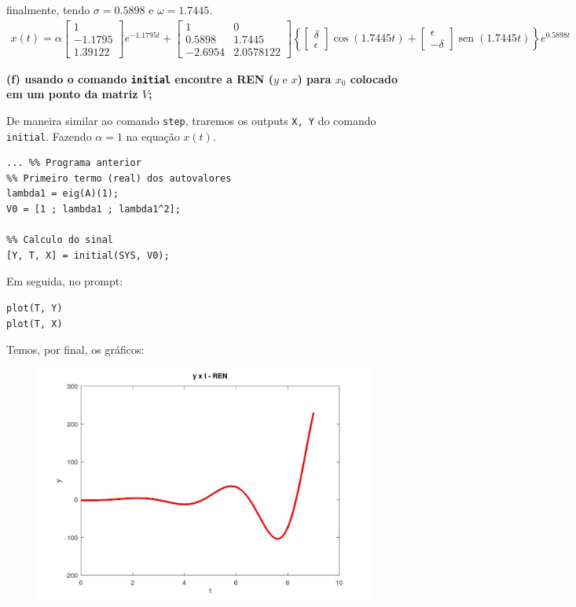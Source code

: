 \documentclass[11pt]{article}
\DeclareMathOperator{\sen}{sen}
\begin{document}
finalmente, tendo $\sigma = 0.5898$ e $\omega = 1.7445$.
\begin{align*}
  x(t) = \alpha
  \begin{bmatrix}
    1\\
    -1.1795\\
    1.39122
  \end{bmatrix}
  e^{-1.1795 t} + 
  \begin{bmatrix}
    1 & 0\\
    0.5898 & 1.7445\\
    -2.6954& 2.0578122
  \end{bmatrix}
  \left\{
    \begin{bmatrix}
      \delta\\
      \epsilon
    \end{bmatrix}
    \cos(1.7445 t) +
    \begin{bmatrix}
      \epsilon\\
      -\delta
    \end{bmatrix}
    \sen(1.7445 t)
  \right\}
  e^{0.5898 t}
\end{align*}

\textbf{(f) usando o comando \texttt{initial} encontre a REN ($y \text{ e } x$) para $x_0$ colocado em um ponto da matriz $V$;}

De maneira similar ao comando \texttt{step}, traremos os outputs \texttt{X, Y} do comando \texttt{initial}. Fazendo $\alpha = 1$ na equação $x(t)$.
\begin{verbatim}
... %% Programa anterior
%% Primeiro termo (real) dos autovalores
lambda1 = eig(A)(1);
V0 = [1 ; lambda1 ; lambda1^2];

%% Calculo do sinal
[Y, T, X] = initial(SYS, V0);
\end{verbatim}

Em seguida, no prompt:
\begin{verbatim}
plot(T, Y)
plot(T, X)
\end{verbatim}

Temos, por final, os gráficos:
\begin{figure}[h]
  \includegraphics[scale=0.35]{plot1f1.jpg}
  \centering
\end{figure}
\end{document}
